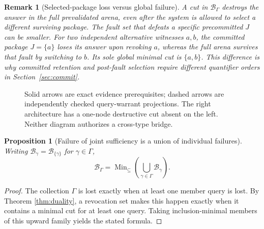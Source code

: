 \documentclass[11pt,letterpaper]{article}
\newtheorem{proposition}[theorem]{Proposition}
\newtheorem{remark}[theorem]{Remark}
\DeclareMathOperator{\Min}{Min}
\newcommand{\calB}{\mathcal B}
\newcommand{\Gam}{\Gamma}
\begin{document}
\begin{remark}[Selected-package loss versus global failure]\label{rem:relative}
A cut in $\calB_\Gam$ destroys the answer in the \emph{full prevalidated arena}, even after the system is allowed to select a different surviving package. The fault set that defeats a specific precommitted $J$ can be smaller. For two independent alternative witnesses $a,b$, the committed package $J=\{a\}$ loses its answer upon revoking $a$, whereas the full arena survives that fault by switching to $b$. Its sole global minimal cut is $\{a,b\}$. This difference is why committed retention and post-fault selection require different quantifier orders in Section~\ref{sec:commit}.
\end{remark}

\begin{figure}[ht]
\centering
{}
\caption{Solid arrows are exact evidence prerequisites; dashed arrows are independently checked query-warrant projections. The right architecture has a one-node destructive cut absent on the left. Neither diagram authorizes a cross-type bridge.}
\label{fig:cuts}
\end{figure}

\begin{proposition}[Failure of joint sufficiency is a union of individual failures]\label{prop:queryunion}
Writing $\calB_\gamma=\calB_{\{\gamma\}}$ for $\gamma\in\Gam$,
\[
\calB_\Gam=\Min_{\subseteq}\left(\bigcup_{\gamma\in\Gam}\calB_\gamma\right).
\tag{5}\label{eq:unioncuts}
\]
\end{proposition}
\begin{proof}
The collection $\Gam$ is lost exactly when at least one member query is lost. By Theorem \ref{thm:duality}, a revocation set makes this happen exactly when it contains a minimal cut for at least one query. Taking inclusion-minimal members of this upward family yields the stated formula.
\end{proof}
\end{document}
